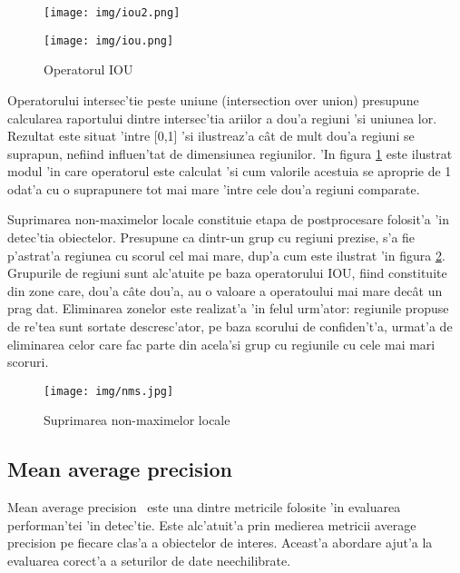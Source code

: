 \documentclass[12pt,a4paper,twoside]{report}
\begin{document}
\begin{figure}[H]
\centering
\begin{minipage}{.3\textwidth}
  \centering
  \texttt{[image: img/iou2.png]}
\end{minipage}%
\begin{minipage}{.5\textwidth}
  \centering
  \texttt{[image: img/iou.png]}
\end{minipage}
\caption{Operatorul IOU \protect \footnotemark}
\label{fig:iou}
\end{figure}

Operatorului intersec'tie peste uniune (intersection over union) presupune calcularea raportului dintre intersec'tia ariilor a dou'a regiuni 'si uniunea lor. Rezultat este situat 'intre [0,1] 'si ilustreaz'a c\^at de mult dou'a regiuni se suprapun, nefiind influen'tat de dimensiunea regiunilor. 'In figura \ref{fig:iou} este ilustrat modul 'in care operatorul este calculat 'si cum valorile acestuia se aproprie de 1 odat'a cu o suprapunere tot mai mare 'intre cele dou'a regiuni comparate.

Suprimarea non-maximelor locale constituie etapa de postprocesare folosit'a 'in detec'tia obiectelor. Presupune ca dintr-un grup cu regiuni prezise, s'a fie p'astrat'a regiunea cu scorul cel mai mare, dup'a cum este ilustrat 'in figura \ref{fig:nms}. Grupurile de regiuni sunt alc'atuite pe baza operatorului IOU, fiind constituite din zone care, dou'a c\^ate dou'a, au o valoare a operatoului mai mare dec\^at un prag dat. Eliminarea zonelor este realizat'a 'in felul urm'ator: regiunile propuse de re'tea sunt sortate descresc'ator, pe baza scorului de confiden't'a, urmat'a de eliminarea celor care fac parte din acela'si grup cu regiunile cu cele mai mari scoruri.


\begin{figure}[H]
  \texttt{[image: img/nms.jpg]}
  \centering
  \caption{Suprimarea non-maximelor locale\protect\footnotemark}
  \label{fig:nms}
\end{figure}

\subsection{Mean average precision}
\label{ch:map}
Mean average precision~\cite{MAP} este una dintre metricile folosite 'in evaluarea performan'tei 'in detec'tie. Este alc'atuit'a prin medierea metricii average precision pe fiecare clas'a a obiectelor de interes. Aceast'a abordare ajut'a la evaluarea corect'a a seturilor de date neechilibrate.
\end{document}

